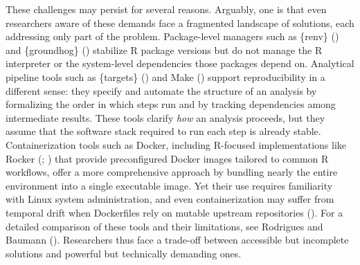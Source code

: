 \documentclass[
  man,
  longtable,
  nolmodern,
  notxfonts,
  notimes,
  colorlinks=true,linkcolor=blue,citecolor=blue,urlcolor=blue]{apa7}
\begin{document}
These challenges may persist for several reasons. Arguably, one is that
even researchers aware of these demands face a fragmented landscape of
solutions, each addressing only part of the problem. Package-level
managers such as \{renv\} () and \{groundhog\} () stabilize R package versions but do not manage the R
interpreter or the system-level dependencies those packages depend on.
Analytical pipeline tools such as \{targets\}
() and Make
() support reproducibility in
a different sense: they specify and automate the structure of an
analysis by formalizing the order in which steps run and by tracking
dependencies among intermediate results. These tools clarify \emph{how}
an analysis proceeds, but they assume that the software stack required
to run each step is already stable. Containerization tools such as
Docker, including R-focused implementations like Rocker
(;
) that provide preconfigured Docker images tailored to common R
workflows, offer a more comprehensive approach by bundling nearly the
entire environment into a single executable image. Yet their use
requires familiarity with Linux system administration, and even
containerization may suffer from temporal drift when Dockerfiles rely on
mutable upstream repositories (). For a detailed comparison of these tools and their
limitations, see Rodrigues and Baumann
(). Researchers thus
face a trade-off between accessible but incomplete solutions and
powerful but technically demanding ones.
\end{document}
